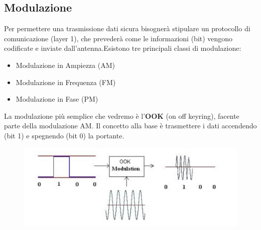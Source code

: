 \subsection{Modulazione}
Per permettere una trasmissione dati sicura bisognerà stipulare un protocollo di comunicazione (layer 1), che prevederà come le informazioni (bit) vengono codificate e inviate dall'antenna.Esistono tre principali classi di modulazione:
\begin{itemize}
    \item Modulazione in Ampiezza (AM)
    \item Modulazione in Frequenza (FM)
    \item Modulazione in Fase (PM)
\end{itemize}
La modulazione più semplice che vedremo è l'\textbf{OOK} (on off keyring), facente parte della modulazione AM.
Il concetto alla base è trasmettere i dati accendendo (bit 1) e spegnendo (bit 0) la portante.
\begin{figure}[h!]
    \centering
    \includegraphics[width=.8\linewidth]{res/OOK.png}
    \caption{}
\end{figure}

